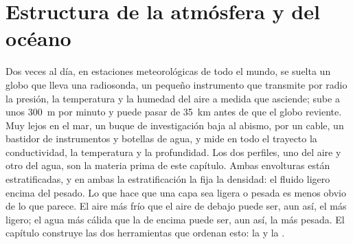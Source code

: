 \chapter{Estructura de la atmósfera y del océano}\label{ch:b1:fluid-envelopes-structure}

Dos veces al día, en estaciones meteorológicas de todo el mundo, se suelta un globo que lleva una radiosonda, un pequeño instrumento que transmite por radio la presión, la temperatura y la humedad del aire a medida que asciende; sube a unos \qty{300}{m} por minuto y puede pasar de \qty{35}{km} antes de que el globo reviente. Muy lejos en el mar, un buque de investigación baja al abismo, por un cable, un bastidor de instrumentos y botellas de agua, y mide en todo el trayecto la conductividad, la temperatura y la profundidad. Los dos perfiles, uno del aire y otro del agua, son la materia prima de este capítulo. Ambas envolturas están estratificadas, y en ambas la estratificación la fija la densidad: el fluido ligero encima del pesado. Lo que hace que una capa sea ligera o pesada es menos obvio de lo que parece. El aire más frío que el aire de debajo puede ser, aun así, el más ligero; el agua más cálida que la de encima puede ser, aun así, la más pesada. El capítulo construye las dos herramientas que ordenan esto: la  y la .

